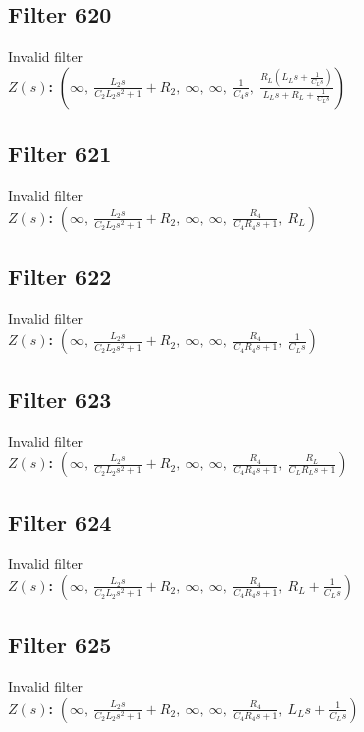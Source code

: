 \documentclass{article}
\begin{document}
\subsection*{Filter 620}
Invalid filter \\ 
\textbf{$Z(s)$:} $\left( \infty, \  \frac{L_{2} s}{C_{2} L_{2} s^{2} + 1} + R_{2}, \  \infty, \  \infty, \  \frac{1}{C_{4} s}, \  \frac{R_{L} \left(L_{L} s + \frac{1}{C_{L} s}\right)}{L_{L} s + R_{L} + \frac{1}{C_{L} s}}\right)$ \\ 
\subsection*{Filter 621}
Invalid filter \\ 
\textbf{$Z(s)$:} $\left( \infty, \  \frac{L_{2} s}{C_{2} L_{2} s^{2} + 1} + R_{2}, \  \infty, \  \infty, \  \frac{R_{4}}{C_{4} R_{4} s + 1}, \  R_{L}\right)$ \\ 
\subsection*{Filter 622}
Invalid filter \\ 
\textbf{$Z(s)$:} $\left( \infty, \  \frac{L_{2} s}{C_{2} L_{2} s^{2} + 1} + R_{2}, \  \infty, \  \infty, \  \frac{R_{4}}{C_{4} R_{4} s + 1}, \  \frac{1}{C_{L} s}\right)$ \\ 
\subsection*{Filter 623}
Invalid filter \\ 
\textbf{$Z(s)$:} $\left( \infty, \  \frac{L_{2} s}{C_{2} L_{2} s^{2} + 1} + R_{2}, \  \infty, \  \infty, \  \frac{R_{4}}{C_{4} R_{4} s + 1}, \  \frac{R_{L}}{C_{L} R_{L} s + 1}\right)$ \\ 
\subsection*{Filter 624}
Invalid filter \\ 
\textbf{$Z(s)$:} $\left( \infty, \  \frac{L_{2} s}{C_{2} L_{2} s^{2} + 1} + R_{2}, \  \infty, \  \infty, \  \frac{R_{4}}{C_{4} R_{4} s + 1}, \  R_{L} + \frac{1}{C_{L} s}\right)$ \\ 
\subsection*{Filter 625}
Invalid filter \\ 
\textbf{$Z(s)$:} $\left( \infty, \  \frac{L_{2} s}{C_{2} L_{2} s^{2} + 1} + R_{2}, \  \infty, \  \infty, \  \frac{R_{4}}{C_{4} R_{4} s + 1}, \  L_{L} s + \frac{1}{C_{L} s}\right)$ \\ 
\end{document}
